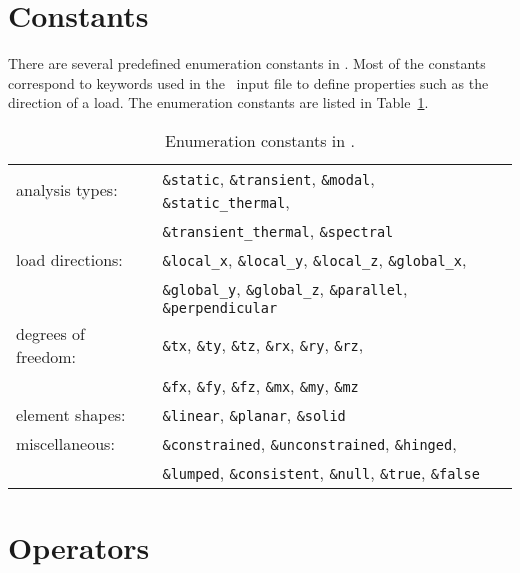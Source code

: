 \section{Constants}
\label{burlap.syntax.constants}

There are several predefined enumeration constants in \burlap.  Most
of the constants correspond to keywords used in the \felt\ input file
to define properties such as the direction of a load.  The enumeration
constants are listed in Table~\ref{burlap.constants.table}.

\begin{table}[htbp]
\begin{center}
\begin{tabular}{ll}
analysis types:
& \verb$&static$, \verb$&transient$, \verb$&modal$, \verb$&static_thermal$, \\
& \verb$&transient_thermal$, \verb$&spectral$ \\

load directions:
& \verb$&local_x$, \verb$&local_y$, \verb$&local_z$, \verb$&global_x$, \\
& \verb$&global_y$, \verb$&global_z$, \verb$&parallel$, \verb$&perpendicular$ \\

degrees of freedom:
& \verb$&tx$, \verb$&ty$, \verb$&tz$, \verb$&rx$, \verb$&ry$, \verb$&rz$, \\
& \verb$&fx$, \verb$&fy$, \verb$&fz$, \verb$&mx$, \verb$&my$, \verb$&mz$ \\

element shapes:
& \verb$&linear$, \verb$&planar$, \verb$&solid$ \\

miscellaneous:
&\verb$&constrained$, \verb$&unconstrained$, \verb$&hinged$, \\
&\verb$&lumped$, \verb$&consistent$, \verb$&null$, \verb$&true$, \verb$&false$\\
\end{tabular}
\caption{Enumeration constants in \burlap.}
\label{burlap.constants.table}
\end{center}
\end{table}


\section{Operators}
\label{burlap.syntax.operators}

